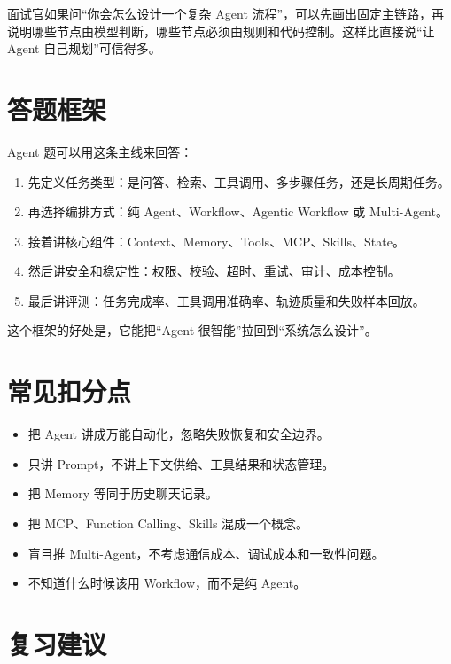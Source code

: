 \documentclass[9pt,a4paper,twocolumn]{ctexart}
\begin{document}
面试官如果问“你会怎么设计一个复杂 Agent 流程”，可以先画出固定主链路，再说明哪些节点由模型判断，哪些节点必须由规则和代码控制。这样比直接说“让 Agent 自己规划”可信得多。



\section*{答题框架}


Agent 题可以用这条主线来回答：


\begin{enumerate}[itemsep=1pt, topsep=2pt]
  \item 先定义任务类型：是问答、检索、工具调用、多步骤任务，还是长周期任务。
  \item 再选择编排方式：纯 Agent、Workflow、Agentic Workflow 或 Multi-Agent。
  \item 接着讲核心组件：Context、Memory、Tools、MCP、Skills、State。
  \item 然后讲安全和稳定性：权限、校验、超时、重试、审计、成本控制。
  \item 最后讲评测：任务完成率、工具调用准确率、轨迹质量和失败样本回放。
\end{enumerate}


这个框架的好处是，它能把“Agent 很智能”拉回到“系统怎么设计”。



\section*{常见扣分点}

\begin{itemize}[itemsep=1pt, topsep=2pt]
  \item 把 Agent 讲成万能自动化，忽略失败恢复和安全边界。
  \item 只讲 Prompt，不讲上下文供给、工具结果和状态管理。
  \item 把 Memory 等同于历史聊天记录。
  \item 把 MCP、Function Calling、Skills 混成一个概念。
  \item 盲目推 Multi-Agent，不考虑通信成本、调试成本和一致性问题。
  \item 不知道什么时候该用 Workflow，而不是纯 Agent。
\end{itemize}


\section*{复习建议}
\end{document}

